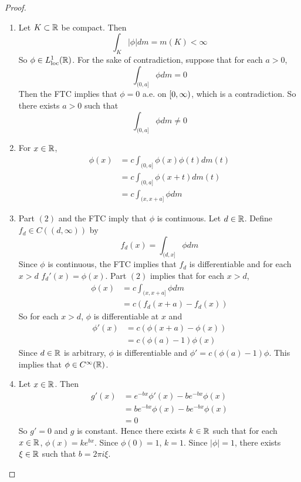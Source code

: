 \documentclass{book}
\begin{document}
	\begin{proof}\
		\begin{enumerate}
			\item Let $K \subset \mathbb{R}$ be compact. Then $$\int_K |\phi| dm = m(K) < \infty$$ So $\phi \in L^1_{\text{loc}}(\mathbb{R})$. For the sake of contradiction, suppose that for each $a >0$, $$\int_{(0,a]}\phi dm = 0$$ 
			Then the FTC implies that $\phi = 0$ a.e. on $[0,\infty)$, which is a contradiction. So there exists $a > 0$ such that $$\int_{(0,a]}\phi dm \neq 0$$
			\item For $x \in \mathbb{R}$, 
			\begin{align*}
				\phi(x) 
				&= c \int_{(0,a]} \phi(x)\phi(t) dm(t) \\
				&= c \int_{(0,a]} \phi(x+t) dm(t) \\
				&= c \int_{(x,x+a]} \phi dm 
			\end{align*}
			\item Part $(2)$ and the FTC imply that $\phi$ is continuous. Let $d \in \mathbb{R}$. Define $f_d \in C((d, \infty))$ by $$f_d(x) = \int_{(d, x]} \phi dm$$ 
			Since $\phi$ is continuous, the FTC implies that $f_d$ is differentiable and for each $x >d$ $f_d'(x) = \phi(x)$. Part $(2)$ implies that for each $x > d$,
			\begin{align*}
				\phi(x) 
				&= c \int_{(x,x+a]} \phi dm \\
				&= c(f_d(x+a) - f_d(x))
			\end{align*}
			So for each $x > d$, $\phi$ is differentiable at $x$ and 
			\begin{align*}
				\phi'(x) 
				&= c(\phi(x+a) - \phi(x)) \\
				&= c(\phi(a) - 1) \phi(x)
			\end{align*}	 
			Since $d \in \mathbb{R}$ is arbitrary, $\phi$ is differentiable and $\phi' = c(\phi(a) - 1) \phi$. This implies that $\phi \in C^{\infty}(\mathbb{R})$.
			\item Let $x \in \mathbb{R}$. Then 
			\begin{align*}
				g'(x) 
				&= e^{-bx}\phi'(x) - be^{-bx}\phi(x) \\
				&= be^{-bx} \phi(x) - be^{-bx}\phi(x) \\
				&= 0
			\end{align*}
			So $g' = 0$ and $g$ is constant. Hence there exists $k \in \mathbb{R}$ such that for each $x \in \mathbb{R}$, $\phi(x) = ke^{bx}$. Since $\phi(0) = 1$, $k = 1$. Since $|\phi| = 1$, there exists $\xi \in \mathbb{R}$ such that $b = 2 \pi i \xi$. 
		\end{enumerate}
	\end{proof}
	
\end{document}
